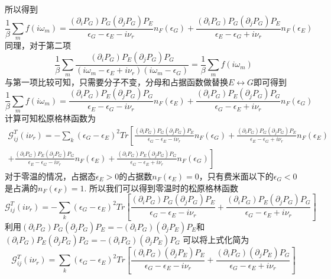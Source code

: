 \documentclass{article}
\numberwithin{equation}{subsection}
\begin{document}
所以得到
\begin{equation}
    \frac{1}{\beta}\sum_mf(i\omega_m)=\frac{(\partial_iP_G)P_G(\partial_jP_G)P_E}{\epsilon_G-\epsilon_E-i\nu_r}n_F(\epsilon_G)+\frac{(\partial_iP_G)P_G(\partial_jP_G)P_E}{\epsilon_E-\epsilon_G+i\nu_r}n_F(\epsilon_E)
\end{equation}
同理，对于第二项
\begin{equation}
    \frac{1}{\beta}\sum_{m}\frac{(\partial_i P_G)P_E(\partial_j P_G)P_G}{(i\omega_m-\epsilon_E+i\nu_r)(i\omega_m-\epsilon_G)}=\frac{1}{\beta}\sum_{m}f(i\omega_m)
\end{equation}
与第一项比较可知，只需要分子不变，分母和占据函数做替换$E\leftrightarrow G$即可得到
\begin{equation}
    \frac{1}{\beta}\sum_{m}f(i\omega_m)=\frac{(\partial_iP_G)P_E(\partial_jP_G)P_G}{\epsilon_E-\epsilon_G-i\nu_r}n_F(\epsilon_E)+\frac{(\partial_iP_G)P_E(\partial_jP_G)P_G}{\epsilon_G-\epsilon_E+i\nu_r}n_F(\epsilon_G)
\end{equation}
计算可知松原格林函数为
\begin{equation}
    \begin{split}
        \mathcal{G}_{ij}^T(i\nu_r)=-\sum_{k}(\epsilon_G-\epsilon_E)^2Tr\left[\frac{(\partial_iP_G)P_G(\partial_jP_G)P_E}{\epsilon_G-\epsilon_E-i\nu_r}n_F(\epsilon_G)+\frac{(\partial_iP_G)P_G(\partial_jP_G)P_E}{\epsilon_E-\epsilon_G+i\nu_r}n_F(\epsilon_E)\right.\\
        \left.+\frac{(\partial_iP_G)P_E(\partial_jP_G)P_G}{\epsilon_E-\epsilon_G-i\nu_r}n_F(\epsilon_E)+\frac{(\partial_iP_G)P_E(\partial_jP_G)P_G}{\epsilon_G-\epsilon_E+i\nu_r}n_F(\epsilon_G)\right]
    \end{split}
\end{equation}
对于零温的情况，占据态$\epsilon_E>0$的占据数$n_F(\epsilon_E)=0$，只有费米面以下的$\epsilon_G<0$是占满的$n_F(\epsilon_F)=1$. 所以我们可以得到零温时的松原格林函数
\begin{equation}
    \mathcal{G}_{ij}^T(i\nu_r)=-\sum_{k}(\epsilon_G-\epsilon_E)^2Tr\left[\frac{(\partial_iP_G)P_G(\partial_jP_G)P_E}{\epsilon_G-\epsilon_E-i\nu_r}+\frac{(\partial_iP_G)P_E(\partial_jP_G)P_G}{\epsilon_G-\epsilon_E+i\nu_r}\right]
\end{equation}
利用$(\partial_iP_G)P_G(\partial_jP_G)P_E=-(\partial_iP_G)(\partial_jP_E)P_E$和$(\partial_iP_G)P_E(\partial_jP_G)P_G=-(\partial_iP_G)(\partial_jP_E)P_G$
可以将上式化简为
\begin{equation}
    \mathcal{G}_{ij}^T(i\nu_r)=\sum_{k}(\epsilon_G-\epsilon_E)^2Tr\left[\frac{(\partial_iP_G)(\partial_jP_E)P_E}{\epsilon_G-\epsilon_E-i\nu_r}+\frac{(\partial_iP_G)(\partial_jP_E)P_G}{\epsilon_G-\epsilon_E+i\nu_r}\right]
\end{equation}
\end{document}
